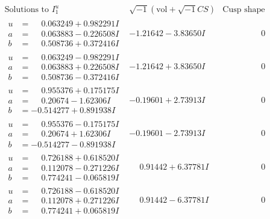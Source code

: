 \documentclass[1p]{elsarticle_modified}
\theoremstyle{definition}
\newcommand{\I}{\sqrt{-1}}
\begin{document}
$$\begin{array}{c|c|c}  
\text{Solutions to }I^u_{1}& \I (\text{vol} + \sqrt{-1}CS) & \text{Cusp shape}\\
 \hline 
\begin{aligned}
u &= \phantom{-}0.063249 + 0.982291 I \\
a &= \phantom{-}0.063883 - 0.226508 I \\
b &= \phantom{-}0.508736 + 0.372416 I\end{aligned}
 & -1.21642 - 3.83650 I & \phantom{-0.000000 } 0 \\ \hline\begin{aligned}
u &= \phantom{-}0.063249 - 0.982291 I \\
a &= \phantom{-}0.063883 + 0.226508 I \\
b &= \phantom{-}0.508736 - 0.372416 I\end{aligned}
 & -1.21642 + 3.83650 I & \phantom{-0.000000 } 0 \\ \hline\begin{aligned}
u &= \phantom{-}0.955376 + 0.175175 I \\
a &= \phantom{-}0.20674 - 1.62306 I \\
b &= -0.514277 + 0.891938 I\end{aligned}
 & -0.19601 + 2.73913 I & \phantom{-0.000000 } 0 \\ \hline\begin{aligned}
u &= \phantom{-}0.955376 - 0.175175 I \\
a &= \phantom{-}0.20674 + 1.62306 I \\
b &= -0.514277 - 0.891938 I\end{aligned}
 & -0.19601 - 2.73913 I & \phantom{-0.000000 } 0 \\ \hline\begin{aligned}
u &= \phantom{-}0.726188 + 0.618520 I \\
a &= \phantom{-}0.112078 - 0.271226 I \\
b &= \phantom{-}0.774241 - 0.065819 I\end{aligned}
 & \phantom{-}0.91442 + 6.37781 I & \phantom{-0.000000 } 0 \\ \hline\begin{aligned}
u &= \phantom{-}0.726188 - 0.618520 I \\
a &= \phantom{-}0.112078 + 0.271226 I \\
b &= \phantom{-}0.774241 + 0.065819 I\end{aligned}
 & \phantom{-}0.91442 - 6.37781 I & \phantom{-0.000000 } 0 \\ \hline\begin{aligned}

\end{aligned}
\end{array}$$
\end{document}
